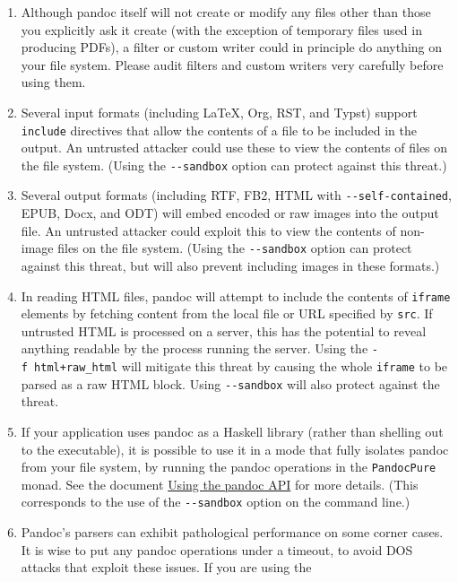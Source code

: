 \documentclass[
]{article}
\begin{document}
\begin{enumerate}
\def\labelenumi{\arabic{enumi}.}
\item
  Although pandoc itself will not create or modify any files other than
  those you explicitly ask it create (with the exception of temporary
  files used in producing PDFs), a filter or custom writer could in
  principle do anything on your file system. Please audit filters and
  custom writers very carefully before using them.
\item
  Several input formats (including LaTeX, Org, RST, and Typst) support
  \texttt{include} directives that allow the contents of a file to be
  included in the output. An untrusted attacker could use these to view
  the contents of files on the file system. (Using the
  \texttt{-\/-sandbox} option can protect against this threat.)
\item
  Several output formats (including RTF, FB2, HTML with
  \texttt{-\/-self-contained}, EPUB, Docx, and ODT) will embed encoded
  or raw images into the output file. An untrusted attacker could
  exploit this to view the contents of non-image files on the file
  system. (Using the \texttt{-\/-sandbox} option can protect against
  this threat, but will also prevent including images in these formats.)
\item
  In reading HTML files, pandoc will attempt to include the contents of
  \texttt{iframe} elements by fetching content from the local file or
  URL specified by \texttt{src}. If untrusted HTML is processed on a
  server, this has the potential to reveal anything readable by the
  process running the server. Using the \texttt{-f\ html+raw\_html} will
  mitigate this threat by causing the whole \texttt{iframe} to be parsed
  as a raw HTML block. Using \texttt{-\/-sandbox} will also protect
  against the threat.
\item
  If your application uses pandoc as a Haskell library (rather than
  shelling out to the executable), it is possible to use it in a mode
  that fully isolates pandoc from your file system, by running the
  pandoc operations in the \texttt{PandocPure} monad. See the document
  \href{https://pandoc.org/using-the-pandoc-api.html}{Using the pandoc
  API} for more details. (This corresponds to the use of the
  \texttt{-\/-sandbox} option on the command line.)
\item
  Pandoc's parsers can exhibit pathological performance on some corner
  cases. It is wise to put any pandoc operations under a timeout, to
  avoid DOS attacks that exploit these issues. If you are using the

\end{enumerate}
\end{document}
